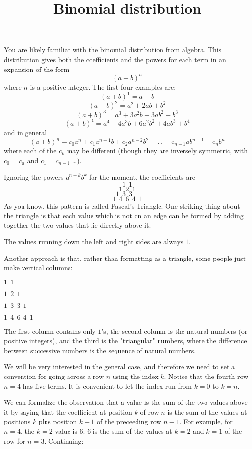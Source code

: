 \documentclass[11pt, oneside]{article}
\title{Binomial distribution}
\date{}
\begin{document}
\maketitle
\Large

\label{sec:binomial}

You are likely familiar with the binomial distribution from algebra.  This distribution gives both the coefficients and the powers for each term in an expansion of the form
\[ (a+b)^n \]
where $n$ is a positive integer.  The first four examples are:
\[ (a+b)^1 = a + b \]
\[ (a+b)^2 = a^2 + 2ab + b^2 \]
\[ (a+b)^3 = a^3 + 3a^2b + 3ab^2 + b^3 \]
\[ (a+b)^4 = a^4 + 4a^3b + 6a^2b^2 + 4ab^3 + b^4 \]
and in general
\[ (a+b)^n = c_0a^n + c_1a^{n-1}b + c_2a^{n-2}b^2 + \dots + c_{n-1}ab^{n-1} + c_nb^n \]
where each of the $c_k$ may be different (though they are inversely symmetric, with $c_0 = c_n$ and $c_1 = c_{n-1}$ \dots).

Ignoring the powers $a^{n-k}b^k$ for the moment, the coefficients are
\[ 1 \ \ 1 \]
\[ 1 \ \ 2 \ \ 1 \]
\[ 1 \ \ 3 \ \ 3 \ \ 1 \]
\[ 1 \ \ 4 \ \ 6 \ \ 4 \ \ 1 \]
As you know, this pattern is called Pascal's Triangle.  One striking thing about the triangle is that each value which is not on an edge can be formed by adding together the two values that lie directly above it.

The values running down the left and right sides are always $1$.

Another approach is that, rather than formatting as a triangle, some people just make vertical columns:

$1 \ \ 1$

$1 \ \ 2 \ \ 1$

$1 \ \ 3 \ \ 3 \ \ 1$

$1 \ \ 4 \ \ 6 \ \ 4 \ \ 1$

The first column contains only $1$'s, the second column is the natural numbers (or positive integers), and the third is the "triangular" numbers, where the difference between successive numbers is the sequence of natural numbers.

We will be very interested in the general case, and therefore we need to set a convention for going across a row $n$ using the index $k$.  Notice that the fourth row $n = 4$ has five terms.  It is convenient to let the index run from $k=0$ to $k = n$.

We can formalize the observation that a value is the sum of the two values above it by saying that the coefficient at position $k$ of row $n$ is the sum of the values at positions $k$ plus position $k-1$ of the preceeding row $n-1$.  For example, for $n=4$, the $k=2$ value is $6$.  $6$ is the sum of the values at $k=2$ and $k=1$ of the row for $n=3$.  Continuing:
\end{document}
